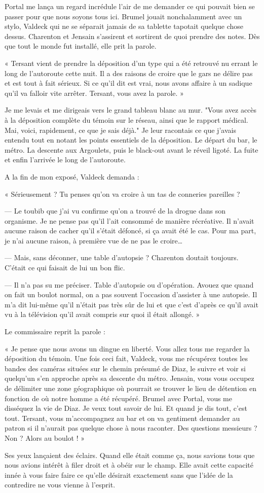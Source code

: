 Portal me lança un regard incrédule l'air de me demander ce qui pouvait bien se passer pour que nous soyons tous ici.
Brumel jouait nonchalamment avec un stylo, Valdeck qui ne se séparait jamais de sa tablette tapotait quelque chose
dessus. Charenton et Jensain s'assirent et sortirent de quoi prendre des notes. Dès que tout le monde fut installé, 
elle prit la parole.

« Tersant vient de prendre la déposition d'un type qui a été retrouvé nu errant le long de l'autoroute cette nuit. Il a
des raisons de croire que le gars ne délire pas et est tout à fait sérieux. Si ce qu'il dit est vrai, nous avons affaire
à un sadique qu'il va falloir vite arrêter. Tersant, vous avez la parole. »

Je me levais et me dirigeais vers le grand tableau blanc au mur. "Vous avez accès à la déposition complète du témoin sur
le réseau, ainsi que le rapport médical. Mai, voici, rapidement, ce que je sais déjà." Je leur racontais ce que j'avais
entendu tout en notant les points essentiels de la déposition. Le départ du bar, le métro. La descente aux Argoulets,
puis le black-out avant le réveil ligoté. La fuite et enfin l'arrivée le long de l'autoroute.

A la fin de mon exposé, Valdeck demanda :

« Sérieusement ? Tu penses qu'on va croire à un tas de conneries pareilles ?

— Le toubib que j'ai vu confirme qu'on a trouvé de la drogue dans son organisme. Je ne pense pas qu'il l'ait consommé de
manière récréative. Il n'avait aucune raison de  cacher qu'il s'était défoncé, si ça avait été le cas. Pour ma part, je
n'ai aucune raison, à première vue de ne pas le croire…

— Mais, sans déconner, une table d'autopsie ? Charenton doutait toujours. C'était ce qui faisait de lui un bon flic.

— Il n'a pas su me préciser. Table d'autopsie ou d'opération. Avouez que quand on fait un boulot normal, on a pas
souvent l'occasion d'assister à une autopsie. Il m'a dit lui-même qu'il n'était pas très sûr de lui et que c'est d'après
ce qu'il avait vu à la télévision qu'il avait compris sur quoi il était allongé. »

Le commissaire reprit la parole :

« Je pense que nous avons un dingue en liberté. Vous allez tous me regarder la déposition du témoin. Une fois ceci fait,
Valdeck, vous me récupérez toutes les bandes des caméras situées sur le chemin présumé de Diaz, le suivre et voir si
quelqu'un s'en approche après sa descente du métro. Jensain, vous vous occupez de délimiter une zone géographique
où pourrait se trouver le lieu de détention en fonction de où notre homme a été récupéré. Brumel avec Portal, vous me
disséquez la vie de Diaz. Je veux tout savoir de lui. Et quand je dis tout, c'est tout. Tersant, vous m'accompagnez au
bar et on va gentiment demander au patron si il n'aurait pas quelque chose à nous raconter. Des questions messieurs ?
Non ? Alors au boulot ! »

Ses yeux lançaient des éclairs. Quand elle était comme ça, nous savions tous que nous avions intérêt à filer droit et à
obéir sur le champ. Elle avait cette capacité innée à vous faire faire ce qu'elle désirait exactement sans que l'idée de
la contredire ne vous vienne à l'esprit. 

